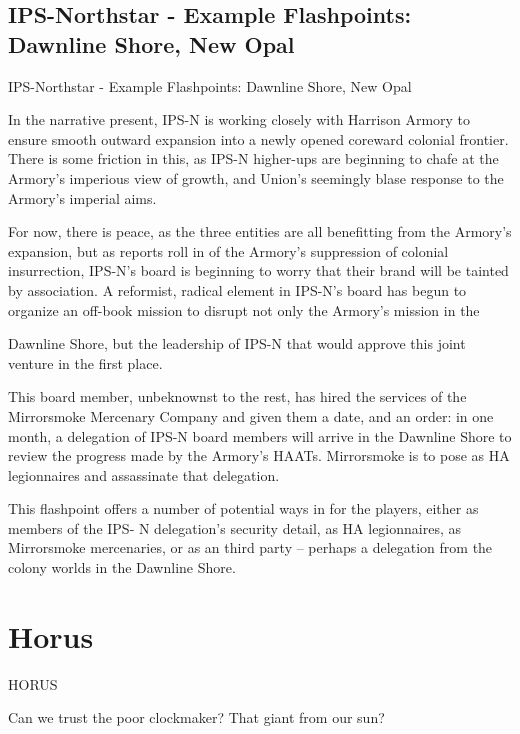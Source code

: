 \subsection{IPS-Northstar - Example Flashpoints: Dawnline Shore, New Opal  }
IPS-Northstar - Example Flashpoints: Dawnline Shore, New Opal  

In the narrative present, IPS-N is working closely with Harrison Armory to ensure smooth  
outward expansion into a newly opened coreward colonial frontier. There is some friction in this,  
as IPS-N higher-ups are beginning to chafe at the Armory’s imperious view of growth, and  
Union’s seemingly blase response to the Armory’s imperial aims. 
 

For now, there is peace, as the three entities are all benefitting from the Armory’s expansion, but  
as reports roll in of the Armory’s suppression of colonial insurrection, IPS-N’s board is beginning  
to worry that their brand will be tainted by association. A reformist, radical element in IPS-N’s  
board has begun to organize an off-book mission to disrupt not only the Armory’s mission in the  

                                                                                                           


Dawnline Shore, but the leadership of IPS-N that would approve this joint venture in the first  
place. 
 

This board member, unbeknownst to the rest, has hired the services of the Mirrorsmoke  
Mercenary Company and given them a date, and an order: in one month, a delegation of IPS-N  
board members will arrive in the Dawnline Shore to review the progress made by the Armory’s  
HAATs. Mirrorsmoke is to pose as HA legionnaires and assassinate that delegation. 
 

This flashpoint offers a number of potential ways in for the players, either as members of the IPS- 
N delegation’s security detail, as HA legionnaires, as Mirrorsmoke mercenaries, or as an third  
party -- perhaps a delegation from the colony worlds in the Dawnline Shore.     

                                                                                                           
\section{Horus}

HORUS   

                                     Can we trust the poor clockmaker? That giant from our  
                                    sun?   


